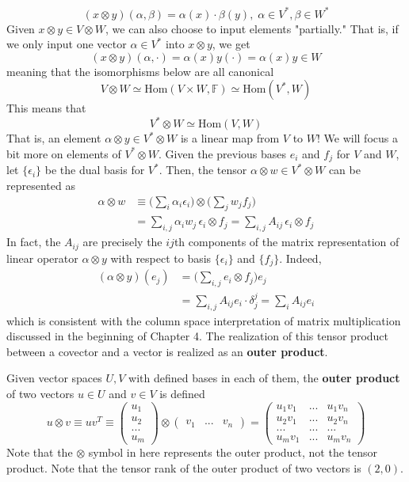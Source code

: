   \[(x \otimes y) (\alpha, \beta) = \alpha (x) \cdot \beta (y), \; \alpha \in V^*, \beta \in W^*\]
  Given $x \otimes y \in V \otimes W$, we can also choose to input elements "partially." That is, if we only input one vector $\alpha \in V^*$ into $x \otimes y$, we get
  \[(x \otimes y) (\alpha, \cdot) = \alpha(x) y (\cdot) = \alpha (x) y \in W\]
  meaning that the isomorphisms below are all canonical
  \[V \otimes W \simeq \text{Hom}(V \times W, \mathbb{F}) \simeq \text{Hom}(V^*, W)\]
  This means that
  \[V^* \otimes W \simeq \text{Hom}(V, W)\]
  That is, an element $\alpha \otimes y \in V^* \otimes W$ is a linear map from $V$ to $W$! We will focus a bit more on elements of $V^* \otimes W$. Given the previous bases $e_i$ and $f_j$ for $V$ and $W$, let $\{\epsilon_i\}$ be the dual basis for $V^*$. Then, the tensor $\alpha \otimes w \in V^* \otimes W$ can be represented as 
  \begin{align*}
      \alpha \otimes w & \equiv \bigg(\sum_i \alpha_i \epsilon_i \bigg) \otimes \bigg( \sum_j w_j f_j \bigg) \\
      & = \sum_{i, j} \alpha_i w_j \, \epsilon_i \otimes f_j = \sum_{i, j} A_{i j} \, \epsilon_i \otimes f_j
  \end{align*}
  In fact, the $A_{i j}$ are precisely the $i j$th components of the matrix representation of linear operator $\alpha \otimes y$ with respect to basis $\{\epsilon_i\}$ and $\{f_j\}$. Indeed,
  \begin{align*}
      (\alpha \otimes y)(e_j) & = \bigg( \sum_{i, j} e_i \otimes f_j \bigg) e_j \\
      & = \sum_{i, j} A_{i j} e_i \cdot \delta^j_j = \sum_{i} A_{i j} e_i
  \end{align*}
  which is consistent with the column space interpretation of matrix multiplication discussed in the beginning of Chapter 4. The realization of this tensor product between a covector and a vector is realized as an \textbf{outer product}. 

  \begin{definition}
  Given vector spaces $U, V$ with defined bases in each of them, the \textbf{outer product} of two vectors $u \in U$ and $v \in V$ is defined
  \[u \otimes v \equiv u v^T \equiv \begin{pmatrix}
  u_1 \\ u_2 \\ ... \\ u_m
  \end{pmatrix} \otimes \begin{pmatrix}
  v_1 & ... & v_n
  \end{pmatrix} = \begin{pmatrix}
  u_1 v_1 & ... & u_1 v_n \\
  u_2 v_1 & ... & u_2 v_n \\
  ... & ... & ... \\
  u_m v_1 & ... & u_m v_n 
  \end{pmatrix}\]
  Note that the $\otimes$ symbol in here represents the outer product, not the tensor product. Note that the tensor rank of the outer product of two vectors is $(2,0)$. 
  \end{definition}


